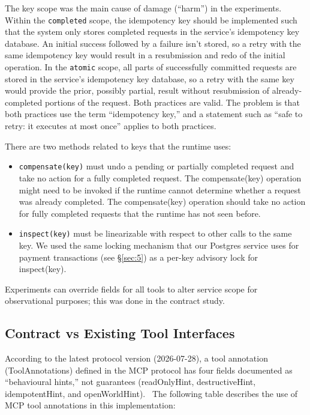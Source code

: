 \documentclass[letterpaper,twocolumn,10pt]{article}
\begin{document}
The key scope was the main cause of damage (``harm'') in the experiments. Within the \texttt{completed} scope, the idempotency key should be implemented such that the system only stores completed requests in the service's idempotency key database. An initial success followed by a failure isn't stored, so a retry with the same idempotency key would result in a resubmission and redo of the initial operation. In the \texttt{atomic} scope, all parts of successfully committed requests are stored in the service's idempotency key database, so a retry with the same key would provide the prior, possibly partial, result without resubmission of already-completed portions of the request. Both practices are valid. The problem is that both practices use the term ``idempotency key,'' and a statement such as ``safe to retry: it executes at most once'' applies to both practices.

There are two methods related to keys that the runtime uses:

\begin{itemize}
\item \texttt{compensate(key)} must undo a pending or partially completed request and take no action for a fully completed request. The compensate(key) operation might need to be invoked if the runtime cannot determine whether a request was already completed. The compensate(key) operation should take no action for fully completed requests that the runtime has not seen before.
\item \texttt{inspect(key)} must be linearizable with respect to other calls to the same key. We used the same locking mechanism that our Postgres service uses for payment transactions (see \S\ref{sec:5}) as a per-key advisory lock for inspect(key).
\end{itemize}

Experiments can override fields for all tools to alter service scope for observational purposes; this was done in the contract study.

\subsection{Contract vs Existing Tool Interfaces}\label{sec:3.2}

According to the latest protocol version (2026-07-28), a tool annotation (ToolAnnotations) defined in the MCP protocol has four fields documented as ``behavioural hints,'' not guarantees (readOnlyHint, destructiveHint, idempotentHint, and openWorldHint).~\cite{mcp} The following table describes the use of MCP tool annotations in this implementation:
\end{document}
